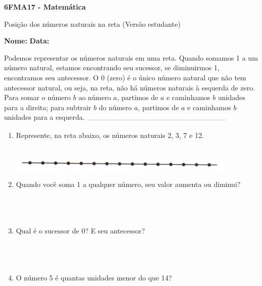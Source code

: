 \documentclass[a4paper,14pt]{article}
\begin{document}
	
	\noindent\textbf{6FMA17 - Matemática} 
	
	\begin{center}Posição dos números naturais na reta (Versão estudante)
	\end{center}
	
	\noindent\textbf{Nome:} \underline{\hspace{10cm}}
	\noindent\textbf{Data:} \underline{\hspace{4cm}}
	
	
	\begin{multicols}{2}
		\noindent Podemos representar os números naturais em uma reta. Quando somamos 1 a um número natural, estamos encontrando seu sucessor, se diminuirmos 1, encontramos seu antecessor. O 0 (zero) é o único número natural que não tem antecessor natural, ou seja, na reta, não há números naturais à esquerda de zero. \\
		Para somar o número $b$ ao número $a$, partimos de $a$ e caminhamos $b$ unidades para a direita; para subtrair $b$ do número $a$, partimos de $a$ e caminhamos $b$ unidades para a esquerda.
		\noindent\textsubscript{-----------------------------------------------------------------------}
		\begin{enumerate} 
			\item Represente, na reta abaixo, os números naturais 2, 3, 7 e 12. \\\\\\
			\includegraphics[width=1\linewidth]{6FMA17_imagens/imagem1}
			\item Quando você soma 1 a qualquer número, seu valor aumenta ou diminui? \\\\\\\\
			\item Qual é o sucessor de 0? E seu antecessor? \\\\\\\\
			\item O número 5 é quantas unidades menor do que 14? \\\\\\

\end{enumerate}
\end{multicols}
\end{document}
